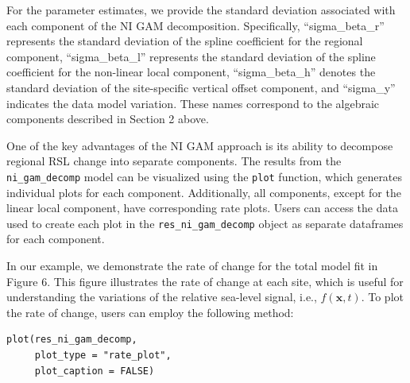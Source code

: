 \normalsize

For the parameter estimates, we provide the standard deviation associated with each component of the NI GAM decomposition. Specifically, ``sigma\_beta\_r'' represents the standard deviation of the spline coefficient for the regional component, ``sigma\_beta\_l'' represents the standard deviation of the spline coefficient for the non-linear local component, ``sigma\_beta\_h'' denotes the standard deviation of the site-specific vertical offset component, and ``sigma\_y'' indicates the data model variation. These names correspond to the algebraic components described in Section 2 above.

One of the key advantages of the NI GAM approach is its ability to decompose regional RSL change into separate components. The results from the \texttt{ni\_gam\_decomp} model can be visualized using the \texttt{plot} function, which generates individual plots for each component. Additionally, all components, except for the linear local component, have corresponding rate plots. Users can access the data used to create each plot in the \texttt{res\_ni\_gam\_decomp} object as separate dataframes for each component.

In our example, we demonstrate the rate of change for the total model fit in Figure 6. This figure illustrates the rate of change at each site, which is useful for understanding the variations of the relative sea-level signal, i.e., \(f(\mathbf{x},t)\). To plot the rate of change, users can employ the following method:
\scriptsize

\begin{verbatim}
plot(res_ni_gam_decomp, 
     plot_type = "rate_plot",
     plot_caption = FALSE)
\end{verbatim}

